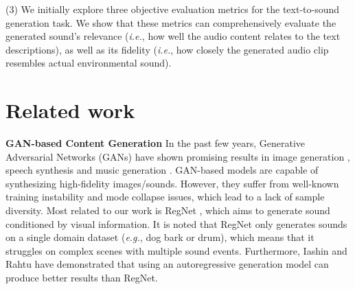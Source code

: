 \documentclass[lettersize,journal]{IEEEtran}
\begin{document}
(3) We initially explore three objective evaluation metrics for the text-to-sound generation task. 
{\color{black}We show that these metrics can comprehensively evaluate the generated sound's relevance (\textit{i.e.}, how well the audio content relates to the text descriptions), as well as its fidelity (\textit{i.e.}, how closely the generated audio clip resembles actual environmental sound).}






\section{Related work}
 \noindent \textbf{GAN-based Content Generation} In the past few years, Generative Adversarial Networks (GANs) have shown promising results in image generation \cite{reed2016generative,zhang2018photographic,brock2018large}, speech synthesis \cite{kumar2019melgan,lee2020multi,guo2019new} and music generation \cite{nistal2020drumgan}. GAN-based models are capable of synthesizing high-fidelity images/sounds. However, they suffer from well-known training instability and mode collapse issues, which lead to a lack of sample diversity. Most related to our work is RegNet \cite{chen2020generating}, which aims to generate sound conditioned by visual information. It is noted that RegNet only generates sounds on a single domain dataset (\textit{e.g.}, dog bark or drum), which means that it struggles on complex scenes with multiple sound events. Furthermore, Iashin and Rahtu \cite{iashin2021taming} have demonstrated that using an autoregressive generation model can produce better results than RegNet.
 
\end{document}
